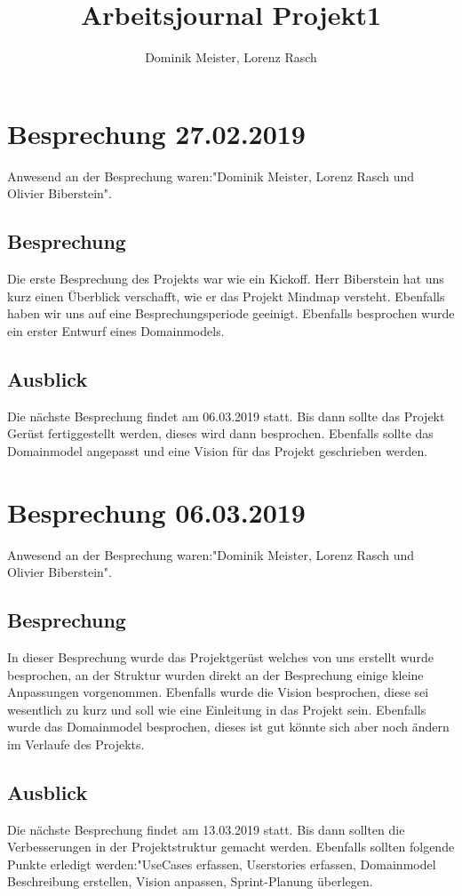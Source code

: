 \documentclass[a4paper,parskip]{scrartcl}
\title{Arbeitsjournal Projekt1}
\author{Dominik Meister, Lorenz Rasch}
\begin{document}
\maketitle
\section{Besprechung 27.02.2019}
Anwesend an der Besprechung waren:"Dominik Meister, Lorenz Rasch und Olivier Biberstein". 
\subsection{Besprechung}
Die erste Besprechung des Projekts war wie ein Kickoff. Herr Biberstein hat uns kurz einen
Überblick verschafft, wie er das Projekt Mindmap versteht. Ebenfalls haben wir uns auf eine Besprechungsperiode geeinigt. Ebenfalls besprochen wurde ein erster Entwurf eines Domainmodels.
\subsection{Ausblick}
Die nächste Besprechung findet am 06.03.2019 statt. Bis dann sollte das Projekt Gerüst fertiggestellt werden, dieses wird dann besprochen. Ebenfalls sollte das Domainmodel angepasst und eine Vision für das Projekt geschrieben werden.

\section{Besprechung 06.03.2019}
Anwesend an der Besprechung waren:"Dominik Meister, Lorenz Rasch und Olivier Biberstein". 
\subsection{Besprechung}
In dieser Besprechung wurde das Projektgerüst welches von uns erstellt wurde besprochen, an der Struktur wurden direkt an der Besprechung einige kleine Anpassungen vorgenommen. Ebenfalls wurde die Vision besprochen, diese sei wesentlich zu kurz und soll wie eine Einleitung in das Projekt sein. Ebenfalls wurde das Domainmodel besprochen, dieses ist gut könnte sich aber noch ändern im Verlaufe des Projekts.
\subsection{Ausblick}
Die nächste Besprechung findet am 13.03.2019 statt. Bis dann sollten die Verbesserungen in der Projektstruktur gemacht werden. Ebenfalls sollten folgende Punkte erledigt werden:"UseCases erfassen, Userstories erfassen, Domainmodel Beschreibung erstellen, Vision anpassen, Sprint-Planung überlegen.
\end{document}
